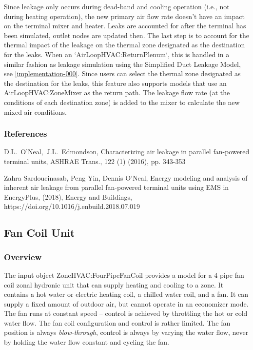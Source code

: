 Since leakage only occurs during dead-band and cooling operation (i.e., not during heating operation), the new primary air flow rate doesn't have an impact on the terminal mixer and heater. Leaks are accounted for after the terminal has been simulated, outlet nodes are updated then. The last step is to account for the thermal impact of the leakage on the thermal zone designated as the destination for the leaks. When an `AirLoopHVAC:ReturnPlenum`, this is handled in a similar fashion as leakage simulation using the Simplified Duct Leakage Model, see \ref{implementation-000}. Since users can select the thermal zone designated as the destination for the leaks, this feature also supports models that use an AirLoopHVAC:ZoneMixer as the return path. The leakage flow rate (at the conditions of each destination zone) is added to the mixer to calculate the new mixed air conditions.

\subsubsection{References}\label{references_parallel_piu_leakage}
D.L. O'Neal, J.L. Edmondson, Characterizing air leakage in parallel fan-powered terminal units, ASHRAE Trans., 122 (1) (2016), pp. 343-353

Zahra Sardoueinasab, Peng Yin, Dennis O'Neal, Energy modeling and analysis of inherent air leakage from parallel fan-powered terminal units using EMS in EnergyPlus, (2018), Energy and Buildings, https://doi.org/10.1016/j.enbuild.2018.07.019

\subsection{Fan Coil Unit}\label{fan-coil-unit}

\subsubsection{Overview}\label{overview-4-003}

The input object ZoneHVAC:FourPipeFanCoil provides a model for a 4 pipe fan coil zonal hydronic unit that can supply heating and cooling to a zone. It contains a hot water or electric heating coil, a chilled water coil, and a fan. It can supply a fixed amount of outdoor air, but cannot operate in an economizer mode. The fan runs at constant speed -- control is achieved by throttling the hot or cold water flow. The fan coil configuration and control is rather limited. The fan position is always \emph{blow-through}, control is always by varying the water flow, never by holding the water flow constant and cycling the fan.

